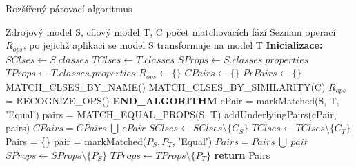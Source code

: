 \documentclass[11pt,twoside,a4paper]{book}
\begin{document}
\begin{algorithm}
 \caption{Rozšířený párovací
 algoritmus}\label{algo:matching_ext}

\begin{algorithmic}[1]
   \Require Zdrojový model S, cílový model T, C počet matchovacích fází
   \Ensure Seznam operací $R_{ops}$, po jejichž aplikaci se model S transformuje
       na model T
   \Statex
   \State \textbf{Inicializace:}
   \State $SClses \gets S.classes$  
   \State $TClses \gets T.classes$ 
   \State $SProps \gets S.classes.properties$ 
   \State $TProps \gets T.classes.properties$ 
   \State $R_{ops} \gets \{\}$
   \State $CPairs \gets \{\}$
   \State $PrPairs \gets \{\}$
   \Statex	   
   \State MATCH\_CLSES\_BY\_NAME()
   \State MATCH\_CLSES\_BY\_SIMILARITY(C)
   \State $R_{ops}$= RECOGNIZE\_OPS()
   \State \textbf{END\_ALGORITHM}
   \Statex
    \label{algo:matching:forEqualCls}
   	        \State cPair = markMatched(S, T, 'Equal') 
   	        \label{algo:matching_ext:make_pair} 
   	        \State  pairs = MATCH\_EQUAL\_PROPS(S, T)
   	        \State  addUnderlyingPairs(cPair, pairs)
   	        \State  $CPairs = CPairs\ \bigcup \ cPair$
   	        \State $SClses \gets SClses \setminus \{ C_S\}$
   	        \State $TClses \gets TClses \setminus \{ C_T\}$   	        
   	     \EndIf
      \EndFor
   \EndFor
  \EndProcedure	      
   \Statex	
   \label{algo:matching_ext:match_equal_props} \State Pairs = \{\}
   	           \State pair = markMatched($P_S, P_T$, 'Equal')
   	           \State $Pairs = Pairs\ \bigcup\ pair$
   	           \State $SProps \gets SProps \setminus \{ P_S\}$
   	           \State $TProps \gets TProps \setminus \{ P_T\}$
   	        \EndIf
   	      \EndFor
   	   \EndFor
   	   \State \textbf{return } Pairs
   \EndProcedure  
\end{algorithmic}
\end{algorithm}
\end{document}
